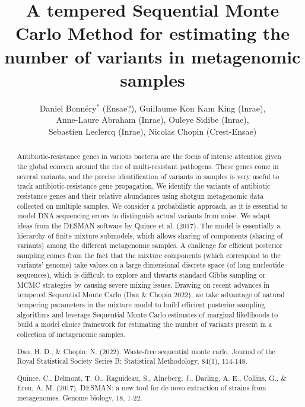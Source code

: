 \documentclass{article}
\title{A tempered Sequential Monte Carlo Method for estimating the number of variants in metagenomic samples}
\author{Daniel Bonnéry$^*$ (Ensae?), 
        Guillaume Kon Kam King (Inrae),\\
        Anne-Laure Abraham (Inrae),
		Ouleye Sidibe (Inrae),\\
		Sebastien Leclercq (Inrae),
        Nicolas Chopin (Crest-Ensae)        
        }
\date{}
\begin{document}
\maketitle




\begin{abstract}



Antibiotic-resistance genes in various bacteria are the focus of intense attention given the global concern around the rise of multi-resistant pathogens. These genes come in several variants, and the precise identification of variants in samples is very useful to track antibiotic-resistance gene propagation. We identify the variants of antibiotic resistance genes and their relative abundances using shotgun metagenomic data collected on multiple samples. We consider a probabilistic approach,  as it is essential to model DNA sequencing errors to distinguish actual variants from noise. We adapt ideas from the DESMAN software by Quince et al. (2017). The model is essentially a hierarchy of finite mixture submodels, which allows sharing of components (sharing of variants) among the different metagenomic samples. A challenge for efficient posterior sampling comes from the fact that the mixture components (which correspond to the variants' genome) take values on a large dimensional discrete space (of long nucleotide sequences), which is difficult to explore and thwarts standard Gibbs sampling or MCMC strategies by causing severe mixing issues. Drawing on recent advances in tempered Sequential Monte Carlo (Dau \&  Chopin 2022), we take advantage of natural tempering parameters in the mixture model to build efficient posterior sampling algorithms and leverage Sequential Monte Carlo estimates of marginal likelihoods to build a model choice framework for estimating the number of variants present in a collection of metagenomic samples.

\vspace{1cm}

\small{
Dau, H. D., \& Chopin, N. (2022). Waste-free sequential monte carlo. Journal of the Royal Statistical Society Series B: Statistical Methodology, 84(1), 114-148.

Quince, C., Delmont, T. O., Raguideau, S., Alneberg, J., Darling, A. E., Collins, G., \& Eren, A. M. (2017). DESMAN: a new tool for de novo extraction of strains from metagenomes. Genome biology, 18, 1-22.
}

\end{abstract}
\end{document}
